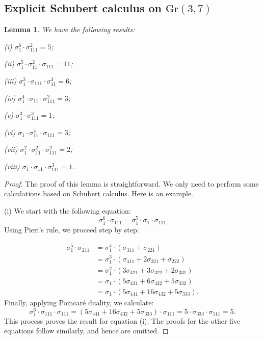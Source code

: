 \documentclass{article}
\newtheorem{lemma}[theorem]{Lemma}
\theoremstyle{definition}
\begin{document}
\subsection{Explicit Schubert calculus on $\mathrm{Gr}(3, 7)$}
\begin{lemma}\label{LmmExplicitSchubertCalculus}
We have the following results:

(i) $\sigma_1^6 \cdot \sigma_{111}^2 = 5$;

(ii) $\sigma_1^5 \cdot \sigma_{11}^2 \cdot \sigma_{111} = 11$;

(iii) $\sigma_1^3 \cdot \sigma_{111} \cdot \sigma_{11}^3 = 6$;

(iv) $\sigma_1^4 \cdot \sigma_{11} \cdot \sigma_{111}^2 = 3$;

(v) $\sigma_1^3 \cdot \sigma_{111}^3 = 1$;

(vi) $\sigma_1 \cdot \sigma_{11}^4 \cdot \sigma_{111} = 3$;

(vii) $\sigma_1^2 \cdot \sigma_{11}^2 \cdot \sigma_{111}^2 = 2$;

(viii) $\sigma_1 \cdot \sigma_{11} \cdot \sigma_{111}^3 = 1$.
\end{lemma}

\begin{proof}
The proof of this lemma is straightforward. We only need to perform some calculations based on Schubert calculus. Here is an example.

(i) We start with the following equation:
\[
\sigma_1^6 \cdot \sigma_{111} = \sigma_1^5 \cdot \sigma_1 \cdot \sigma_{111}
\]
Using Pieri's rule, we proceed step by step:

\begin{align*}
\sigma_1^5 \cdot \sigma_{211} &= \sigma_1^4 \cdot (\sigma_{311} + \sigma_{221}) \\
&= \sigma_1^3 \cdot (\sigma_{411} + 2\sigma_{321} + \sigma_{222}) \\
&= \sigma_1^2 \cdot (3\sigma_{421} + 3\sigma_{322} + 2\sigma_{331}) \\
&= \sigma_1 \cdot (5\sigma_{431} + 6\sigma_{422} + 5\sigma_{332}) \\
&= \sigma_1 \cdot (5\sigma_{441} + 16\sigma_{432} + 5\sigma_{333}).
\end{align*}
Finally, applying Poincaré duality, we calculate:
\[
\sigma_1^6 \cdot \sigma_{111} \cdot \sigma_{111} = (5\sigma_{441} + 16\sigma_{432} + 5\sigma_{333}) \cdot \sigma_{111}
= 5 \cdot \sigma_{333} \cdot \sigma_{111} = 5.
\]
This process proves the result for equation (i). The proofs for the other five equations follow similarly, and hence are omitted.
\end{proof}
\end{document}
